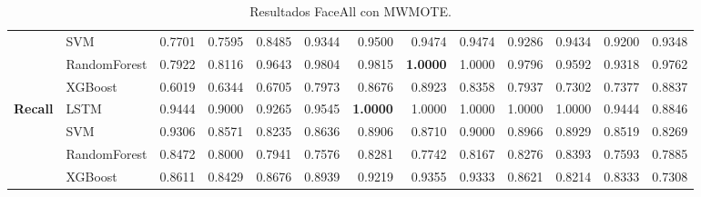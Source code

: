 \begin{table}[h]
\begin{adjustbox}{max width=15cm}
\begin{tabular}{|c|l|r|r|r|r|r|r|r|r|r|r|r|}
			& SVM &  0.7701 &  0.7595 &  0.8485 &  0.9344 &  0.9500 &  0.9474 &  0.9474 &  0.9286 &  0.9434 &  0.9200 &  0.9348 \\
			& RandomForest &  0.7922 &  0.8116 &  0.9643 &  0.9804 &  0.9815 &  \textbf{1.0000} &  1.0000 &  0.9796 &  0.9592 &  0.9318 &  0.9762 \\
			& XGBoost &  0.6019 &  0.6344 &  0.6705 &  0.7973 &  0.8676 &  0.8923 &  0.8358 &  0.7937 &  0.7302 &  0.7377 &  0.8837 \\
			\hline
			\textbf{Recall} & LSTM &  0.9444 &  0.9000 &  0.9265 &  0.9545 &  \textbf{1.0000} &  1.0000 &  1.0000 &  1.0000 &  1.0000 &  0.9444 &  0.8846 \\
			& SVM &  0.9306 &  0.8571 &  0.8235 &  0.8636 &  0.8906 &  0.8710 &  0.9000 &  0.8966 &  0.8929 &  0.8519 &  0.8269 \\
			& RandomForest &  0.8472 &  0.8000 &  0.7941 &  0.7576 &  0.8281 &  0.7742 &  0.8167 &  0.8276 &  0.8393 &  0.7593 &  0.7885 \\
			& XGBoost &  0.8611 &  0.8429 &  0.8676 &  0.8939 &  0.9219 &  0.9355 &  0.9333 &  0.8621 &  0.8214 &  0.8333 &  0.7308 \\
			\hline
		\end{tabular}
	\end{adjustbox}
	\caption{Resultados FaceAll con MWMOTE.}
	\label{tab:faceAllMWMOTE}
\end{table}

